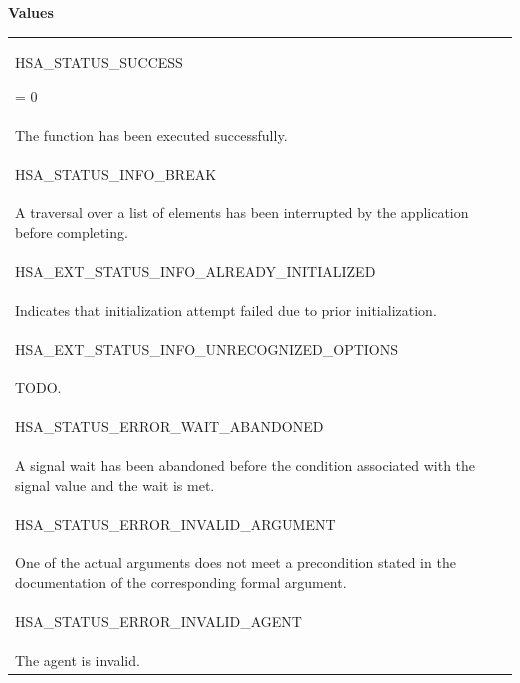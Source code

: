 \documentclass[final]{book}
\newcommand{\reftyp}[1]{#1}
\newcommand{\refenu}[1]{\reftyp{#1}}
\begin{document}
\noindent\textbf{Values}\\[-5mm]
\begin{longtable}{@{\hspace{2em}}p{\linewidth-2em}}
\hspace{-2em}\hypertarget{group__status_1ggad755322e7ff95456520e8abdbe90d225ae382ea0c9c05cce5a60d0317375159cc}{\refenu{HSA_\-STATUS_\-SUCCESS}} = 0\\The function has been executed successfully.\\[2mm]
\hspace{-2em}\hypertarget{group__status_1ggad755322e7ff95456520e8abdbe90d225a86c476121ca787ff75f6a4676507b221}{\refenu{HSA_\-STATUS_\-INFO_\-BREAK}} \\A traversal over a list of elements has been interrupted by the application before completing.\\[2mm]
\hspace{-2em}\hypertarget{group__status_1ggad755322e7ff95456520e8abdbe90d225a0882e3ebb9cc8a5c6033c43ee7a6d898}{\refenu{HSA_\-EXT_\-STATUS_\-INFO_\-ALREADY_\-INITIALIZED}} \\Indicates that initialization attempt failed due to prior initialization.\\[2mm]
\hspace{-2em}\hypertarget{group__status_1ggad755322e7ff95456520e8abdbe90d225a60343279bea68766b037297915b5f903}{\refenu{HSA_\-EXT_\-STATUS_\-INFO_\-UNRECOGNIZED_\-OPTIONS}} \\TODO.\\[2mm]
\hspace{-2em}\hypertarget{group__status_1ggad755322e7ff95456520e8abdbe90d225a3081a89b2b191a77f426b5697bca7360}{\refenu{HSA_\-STATUS_\-ERROR_\-WAIT_\-ABANDONED}} \\A signal wait has been abandoned before the condition associated with the signal value and the wait is met.\\[2mm]
\hspace{-2em}\hypertarget{group__status_1ggad755322e7ff95456520e8abdbe90d225ac7d3651f75107d2a6a8ba3b25683c030}{\refenu{HSA_\-STATUS_\-ERROR_\-INVALID_\-ARGUMENT}} \\One of the actual arguments does not meet a precondition stated in the documentation of the corresponding formal argument.\\[2mm]
\hspace{-2em}\hypertarget{group__status_1ggad755322e7ff95456520e8abdbe90d225a3a5d835c109c2d0ad5b9c2771e133e5d}{\refenu{HSA_\-STATUS_\-ERROR_\-INVALID_\-AGENT}} \\The agent is invalid.\\[2mm]

\end{longtable}
\end{document}
